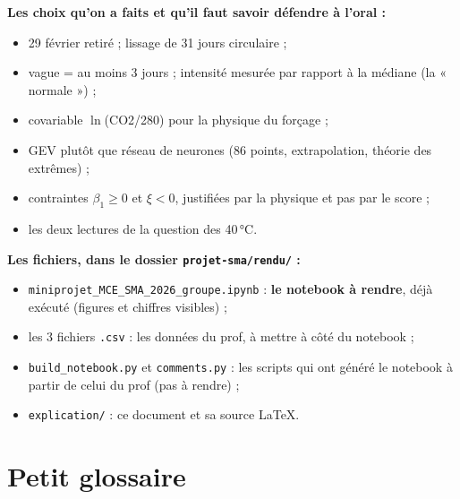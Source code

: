\documentclass[11pt,a4paper]{article}
\newcommand{\f}[1]{\texttt{#1}}
\begin{document}
\textbf{Les choix qu'on a faits et qu'il faut savoir défendre à l'oral :}
\begin{itemize}
  \item 29 février retiré ; lissage de 31 jours circulaire ;
  \item vague = au moins 3 jours ; intensité mesurée par rapport à la médiane (la « normale ») ;
  \item covariable $\ln$(CO2/280) pour la physique du forçage ;
  \item GEV plutôt que réseau de neurones (86 points, extrapolation, théorie des extrêmes) ;
  \item contraintes $\beta_1\ge0$ et $\xi<0$, justifiées par la physique et pas par le score ;
  \item les deux lectures de la question des 40\,°C.
\end{itemize}

\textbf{Les fichiers, dans le dossier \f{projet-sma/rendu/} :}
\begin{itemize}
  \item \f{miniprojet\_MCE\_SMA\_2026\_groupe.ipynb} : \textbf{le notebook à rendre}, déjà exécuté (figures et chiffres visibles) ;
  \item les 3 fichiers \f{.csv} : les données du prof, à mettre à côté du notebook ;
  \item \f{build\_notebook.py} et \f{comments.py} : les scripts qui ont généré le notebook à partir de celui du prof (pas à rendre) ;
  \item \f{explication/} : ce document et sa source LaTeX.
\end{itemize}

\section{Petit glossaire}
\end{document}
